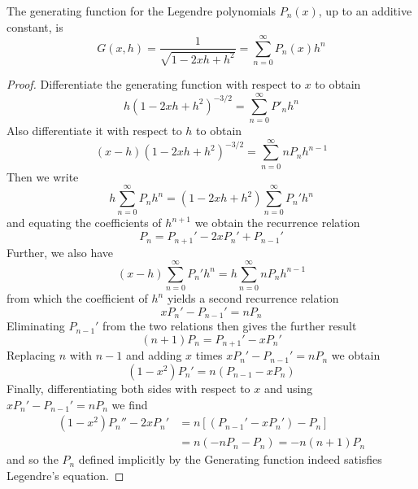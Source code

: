 \documentclass[12pt, a4paper, oneside, openright, titlepage]{book}
\begin{document}
\begin{defn}
    The generating function for the Legendre polynomials $P_n(x)$, up to an additive constant, is \begin{equation*}
        G(x,h) = \frac{1}{\sqrt{1-2xh+h^2}} = \sum_{n=0}^{\infty}P_n(x)h^n
    \end{equation*}
\end{defn}
\begin{proof}
    Differentiate the generating function with respect to $x$ to obtain \begin{equation*}
        h(1-2xh+h^2)^{-3/2} = \sum_{n=0}^{\infty}P'_nh^n
    \end{equation*}
    Also differentiate it with respect to $h$ to obtain \begin{equation*}
        (x-h)(1-2xh+h^2)^{-3/2} = \sum_{n=0}^{\infty}nP_nh^{n-1}
    \end{equation*}
    Then we write \begin{equation*}
        h\sum_{n=0}^{\infty}P_nh^n = (1-2xh+h^2)\sum_{n=0}^{\infty}P_n'h^n
    \end{equation*}
    and equating the coefficients of $h^{n+1}$ we obtain the recurrence relation \begin{equation*}
        P_n = P_{n+1}' - 2xP_n'+P_{n-1}'
    \end{equation*}
    Further, we also have \begin{equation*}
        (x-h)\sum_{n=0}^{\infty}P_n'h^n = h\sum_{n=0}^{\infty}nP_nh^{n-1}
    \end{equation*}
    from which the coefficient of $h^n$ yields a second recurrence relation \begin{equation*}
        xP_n' - P_{n-1}' = nP_n
    \end{equation*}
    Eliminating $P_{n-1}'$ from the two relations then gives the further result \begin{equation*}
        (n+1)P_n = P_{n+1}' - xP_n'
    \end{equation*}
    Replacing $n$ with $n-1$ and adding $x$ times $xP_n'-P_{n-1}'=nP_n$ we obtain \begin{equation*}
        (1-x^2)P_n' = n(P_{n-1}-xP_n)
    \end{equation*}
    Finally, differentiating both sides with respect to $x$ and using $xP_n'-P_{n-1}'=nP_n$ we find \begin{align*}
        (1-x^2)P_n'' - 2xP_n' &= n[(P_{n-1}'-xP_n')-P_n] \\
        &= n(-nP_n-P_n) = -n(n+1)P_n
    \end{align*}
    and so the $P_n$ defined implicitly by the Generating function indeed satisfies Legendre's equation.
\end{proof}
\end{document}
